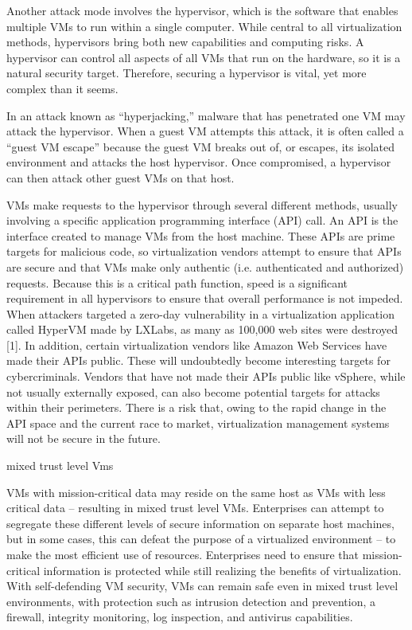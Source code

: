 Another attack mode involves the hypervisor, which is the software that enables multiple VMs to run within a single computer. While central to all virtualization methods, hypervisors bring both new capabilities and computing risks. A hypervisor can control all aspects of all VMs that run on the hardware, so it is a natural security target. Therefore, securing a hypervisor is vital, yet more complex than it seems.

In an attack known as “hyperjacking,” malware that has penetrated one VM may attack the hypervisor. When a guest VM attempts this attack, it is often called a “guest VM escape” because the guest VM breaks out of, or escapes, its isolated environment and attacks the host hypervisor. Once compromised, a hypervisor can then attack other guest VMs on that host.

VMs make requests to the hypervisor through several different methods, usually involving a specific application programming interface (API) call. An API is the interface created to manage VMs from the host machine. These APIs are prime targets for malicious code, so virtualization vendors attempt to ensure that APIs are secure and that VMs make only authentic (i.e. authenticated and authorized) requests. Because this is a critical path function, speed is a significant requirement in all hypervisors to ensure that overall performance is not impeded.
When attackers targeted a zero-day vulnerability in a virtualization application called HyperVM made by LXLabs, as many as 100,000 web sites were destroyed [1]. In addition, certain virtualization vendors like Amazon Web Services have made their APIs public. These will undoubtedly become interesting targets for cybercriminals. Vendors that have not made their APIs public like vSphere, while not usually externally exposed, can also become potential targets for attacks within their perimeters. There is a risk that, owing to the rapid change in the API space and the current race to market, virtualization management systems will not be secure in the future.

mixed trust level Vms

VMs with mission-critical data may reside on the same host as VMs with less critical data – resulting in mixed trust level VMs. Enterprises can attempt to segregate these different levels of secure information on separate host machines, but in some cases, this can defeat the purpose of a virtualized environment – to make the most efficient use of resources. Enterprises need to ensure that mission-critical information is protected while still realizing the benefits of virtualization. With self-defending VM security, VMs can remain safe even in mixed trust level environments, with protection such as intrusion detection and prevention, a firewall, integrity monitoring, log inspection, and antivirus capabilities.

